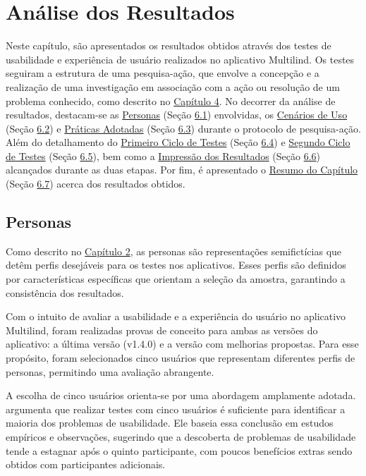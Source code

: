 \chapter[Análise dos Resultados]{Análise dos Resultados}
\label{chap:Análise dos Resultados}
Neste capítulo, são apresentados os resultados obtidos através dos testes de usabilidade e experiência de usuário realizados no aplicativo Multilind. Os testes seguiram a estrutura de uma pesquisa-ação, que envolve a concepção e a realização de uma 
investigação em associação com a ação ou resolução de um problema conhecido, como descrito no \hyperref[sec:Metodologia de Analise de Resultados]{Capítulo 4}. No decorrer da análise de resultados, destacam-se as \hyperref[sec:Personas]{Personas} 
(Seção \hyperref[sec:Personas]{6.1}) envolvidas, os \hyperref[sec:Cenários de Uso]{Cenários de Uso} (Seção \hyperref[sec:Cenários de Uso]{6.2}) e \hyperref[sec:Práticas Adotadas]{Práticas Adotadas} (Seção \hyperref[sec:Práticas Adotadas]{6.3}) 
durante o protocolo de pesquisa-ação. Além do detalhamento do \hyperref[sec:Primeiro Ciclo]{Primeiro Ciclo de Testes} (Seção \hyperref[sec:Primeiro Ciclo]{6.4}) e \hyperref[sec:Segundo Ciclo]{Segundo Ciclo de Testes} (Seção \hyperref[sec:Segundo Ciclo]{6.5}), 
bem como a \hyperref[sec:Impressão dos Resultados]{Impressão dos Resultados} (Seção \hyperref[sec:Impressão dos Resultados]{6.6}) alcançados durante as duas etapas. Por fim, é apresentado o \hyperref[sec:Resumo do Capítulo 3]{Resumo do Capítulo} 
(Seção \hyperref[sec:Resumo do Capítulo 3]{6.7}) acerca dos resultados obtidos.

\section{Personas}
\label{sec:Personas}
Como descrito no \hyperref[sec:Persona]{Capítulo 2}, as personas são representações semifictícias que detêm perfis desejáveis para os testes nos aplicativos. Esses perfis são definidos por características específicas que orientam a seleção da amostra, 
garantindo a consistência dos resultados. 

Com o intuito de avaliar a usabilidade e a experiência do usuário no aplicativo Multilind, foram realizadas provas de conceito para ambas as versões do aplicativo: a última versão (v1.4.0) e a versão com melhorias propostas. Para esse propósito, 
foram selecionados cinco usuários que representam diferentes perfis de personas, permitindo uma avaliação abrangente.

A escolha de cinco usuários orienta-se por uma abordagem amplamente adotada.  argumenta que realizar testes com cinco usuários é suficiente para identificar a maioria dos problemas de 
usabilidade. Ele baseia essa conclusão em estudos empíricos e observações, sugerindo que a descoberta de problemas de usabilidade tende a estagnar após o quinto participante, com poucos benefícios 
extras sendo obtidos com participantes adicionais.

